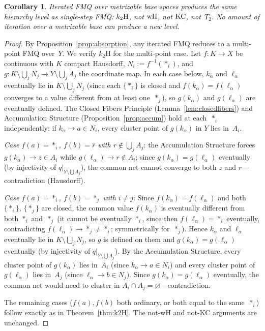 \documentclass[11pt]{article}
\newtheorem{corollary}[theorem]{Corollary}
\theoremstyle{definition}
\theoremstyle{remark}
\begin{document}
\begin{corollary}\label{cor:iteratedlevel}
Iterated FMQ over metrizable base spaces produces the same
hierarchy level as single-step FMQ:
$k_2\textup{H}$, not $\textup{wH}$, not $\textup{KC}$,
not~$T_2$.
No amount of iteration over a metrizable base can produce a
new level.
\end{corollary}

\begin{proof}
By Proposition~\ref{prop:absorption}, any iterated FMQ
reduces to a multi-point FMQ over~$Y$.
We verify $k_2$H for the multi-point case.
Let $f\colon K \to X$ be continuous with $K$ compact Hausdorff,
$N_i := f^{-1}(\ast_i)$, and
$g\colon K \setminus \bigcup_j N_j \to Y \setminus \bigcup_j A_j$
the coordinate map.
In each case below, $k_\alpha$ and $\ell_\alpha$ eventually lie in
$K \setminus \bigcup_j N_j$ (since each $\{\ast_i\}$ is closed and
$f(k_\alpha) = f(\ell_\alpha)$ converges to a value different from
at least one~$\ast_j$), so $g(k_\alpha)$ and $g(\ell_\alpha)$ are
eventually defined.
The Closed Fibers Principle (Lemma~\ref{lem:closedfibers}) and
Accumulation Structure (Proposition~\ref{prop:accum}) hold at
each~$\ast_i$ independently: if $k_\alpha \to a \in N_i$, every
cluster point of $g(k_\alpha)$ in $Y$ lies in~$A_i$.

\emph{Case $f(a) = \ast_i$, $f(b) = \hat{r}$ with $r \notin
\bigcup_j A_j$}: the Accumulation Structure forces
$g(k_\alpha) \to z \in A_i$ while $g(\ell_\alpha) \to r \notin A_i$;
since $g(k_\alpha) = g(\ell_\alpha)$ eventually (by injectivity of
$q|_{Y \setminus \bigcup A_j}$), the common net cannot converge to
both $z$ and $r$---contradiction (Hausdorff).

\emph{Case $f(a) = \ast_i$, $f(b) = \ast_j$ with $i \neq j$}:
Since $f(k_\alpha) = f(\ell_\alpha)$ and both $\{\ast_i\}$,
$\{\ast_j\}$ are closed, the common value $f(k_\alpha)$ is
eventually different from both $\ast_i$ and~$\ast_j$
(it cannot be eventually $\ast_i$, since then
$f(\ell_\alpha) = \ast_i$ eventually, contradicting
$f(\ell_\alpha) \to \ast_j \neq \ast_i$; symmetrically for~$\ast_j$).
Hence $k_\alpha$ and $\ell_\alpha$ eventually lie in
$K \setminus \bigcup_j N_j$, so $g$ is defined on them and
$g(k_\alpha) = g(\ell_\alpha)$ eventually (by injectivity of
$q|_{Y \setminus \bigcup A_j}$).
By the Accumulation Structure, every cluster point of
$g(k_\alpha)$ lies in~$A_i$ (since $k_\alpha \to a \in N_i$)
and every cluster point of $g(\ell_\alpha)$ lies in~$A_j$
(since $\ell_\alpha \to b \in N_j$).
Since $g(k_\alpha) = g(\ell_\alpha)$ eventually, the common net
would need to cluster in $A_i \cap A_j = \varnothing$---contradiction.

The remaining cases ($f(a), f(b)$ both ordinary, or both equal to the
same~$\ast_i$) follow exactly as in Theorem~\ref{thm:k2H}.
The not-wH and not-KC arguments are unchanged.
\end{proof}
\end{document}
